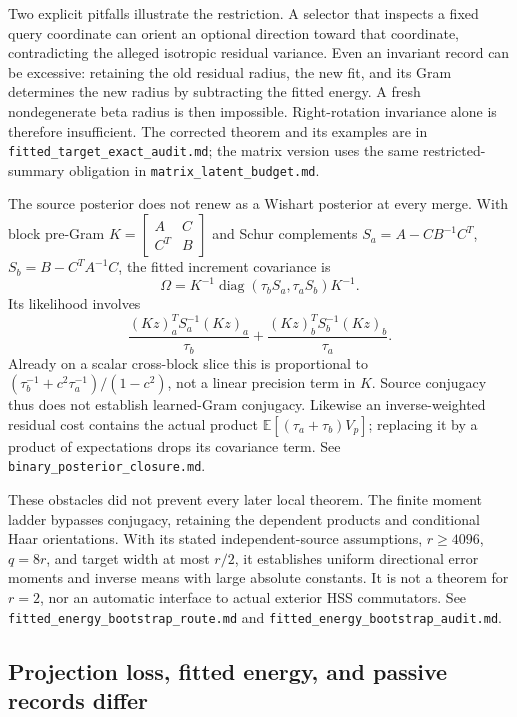 \documentclass[11pt,oneside,openany,a4paper]{book}
\numberwithin{equation}{chapter}
\theoremstyle{definition}
\theoremstyle{remark}
\newcommand{\sourcefile}[1]{{\small\nolinkurl{#1}}}
\begin{document}
Two explicit pitfalls illustrate the restriction.  A selector that
inspects a fixed query coordinate can orient an optional direction
toward that coordinate, contradicting the alleged isotropic residual
variance.  Even an invariant record can be excessive: retaining the
old residual radius, the new fit, and its Gram determines the new
radius by subtracting the fitted energy.  A fresh nondegenerate beta
radius is then impossible.  Right-rotation invariance alone is
therefore insufficient.  The corrected theorem and its examples are
in \sourcefile{fitted_target_exact_audit.md}; the matrix version uses
the same restricted-summary obligation in
\sourcefile{matrix_latent_budget.md}.

The source posterior does not renew as a Wishart posterior at every
merge.  With block pre-Gram
$K=\left[\begin{smallmatrix}A&C\\C^T&B\end{smallmatrix}\right]$
and Schur complements $S_a=A-CB^{-1}C^T$,
$S_b=B-C^TA^{-1}C$, the fitted increment covariance is
\[
 \Omega=K^{-1}\operatorname{diag}(\tau_bS_a,\tau_aS_b)K^{-1}.
\]
Its likelihood involves
\[
 \frac{(Kz)_a^TS_a^{-1}(Kz)_a}{\tau_b}
 +\frac{(Kz)_b^TS_b^{-1}(Kz)_b}{\tau_a}.
\]
Already on a scalar cross-block slice this is proportional to
$(\tau_b^{-1}+c^2\tau_a^{-1})/(1-c^2)$, not a linear precision term
in $K$.  Source conjugacy thus does not establish learned-Gram
conjugacy.  Likewise an inverse-weighted residual cost contains the
actual product $\mathbb E[(\tau_a+\tau_b)V_p]$; replacing it by a
product of expectations drops its covariance term.
See \sourcefile{binary_posterior_closure.md}.

These obstacles did not prevent every later local theorem.  The finite
moment ladder bypasses conjugacy, retaining the dependent products and
conditional Haar orientations.  With its stated independent-source
assumptions, $r\ge4096$, $q=8r$, and target width at most $r/2$, it
establishes uniform directional error moments and inverse means with
large absolute constants.  It is not a theorem for $r=2$, nor an
automatic interface to actual exterior HSS commutators.
See \sourcefile{fitted_energy_bootstrap_route.md} and
\sourcefile{fitted_energy_bootstrap_audit.md}.

\subsection{Projection loss, fitted energy, and passive records differ}
\end{document}
